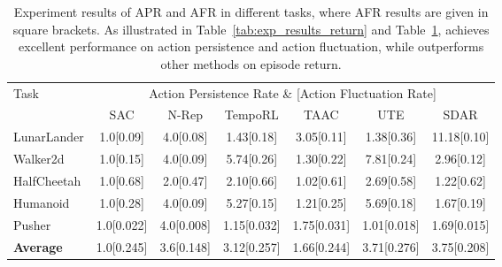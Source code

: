 \begin{table}[t]
\begin{center}
\caption{
Experiment results of APR and AFR in different tasks, where AFR results are given in square brackets.
As illustrated in Table~\ref{tab:exp_results_return} and Table~\ref{tab:exp_results_fluctuation},  achieves excellent performance on action persistence and action fluctuation, while outperforms other methods on episode return.
}
\begin{tabular}{lcccccc}
\toprule
\multirow{2}{*}{Task} & \multicolumn{6}{c}{Action Persistence Rate \& [Action Fluctuation Rate]}  \\
\cmidrule{2-7}
& SAC & N-Rep & TempoRL & TAAC & UTE & SDAR \\ 
\midrule
LunarLander & 1.0[0.09] & 4.0[0.08] & 1.43[0.18] & 3.05[0.11] & 1.38[0.36] & 11.18[0.10] \\ 
Walker2d & 1.0[0.15] & 4.0[0.09] & 5.74[0.26] & 1.30[0.22] & 7.81[0.24] & 2.96[0.12] \\ 
HalfCheetah & 1.0[0.68] & 2.0[0.47]  & 2.10[0.66]  & 1.02[0.61]  & 2.69[0.58]  & 1.22[0.62]  \\ 
Humanoid & 1.0[0.28] & 4.0[0.09] & 5.27[0.15] & 1.21[0.25] & 5.69[0.18] & 1.67[0.19] \\ 
Pusher & 1.0[0.022] & 4.0[0.008]  & 1.15[0.032]  & 1.75[0.031]  & 1.01[0.018]  & 1.69[0.015]  \\ 
\midrule
\textbf{Average} & 1.0[0.245] & 3.6[0.148]  & 3.12[0.257]  & 1.66[0.244]  & 3.71[0.276]  & 3.75[0.208]  \\ 
\bottomrule
\end{tabular}
\end{center}
\label{tab:exp_results_fluctuation}
\end{table}
